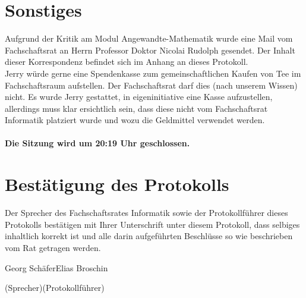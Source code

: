 \documentclass[a4paper, 11pt]{article} %
\newcommand{\protokoller}{Elias Broschin}
\newcommand{\fsiPresident}{Georg Schäfer}
\begin{document}
\section{Sonstiges}
Aufgrund der Kritik am Modul Angewandte-Mathematik wurde eine Mail vom Fachschaftsrat an Herrn Professor Doktor Nicolai Rudolph gesendet. Der Inhalt dieser Korrespondenz befindet sich im Anhang an dieses Protokoll.\\
Jerry würde gerne eine Spendenkasse zum gemeinschaftlichen Kaufen von Tee im Fachschaftsraum aufstellen. Der Fachschaftsrat darf dies (nach unserem Wissen) nicht. Es wurde Jerry gestattet, in eigeninitiative eine Kasse aufzustellen, allerdings muss klar ersichtlich sein, dass diese nicht vom Fachschaftsrat Informatik platziert wurde und wozu die Geldmittel verwendet werden.\\\\
\textbf{Die Sitzung wird um 20:19 Uhr geschlossen.}
\pagebreak

\section{Bestätigung des Protokolls}
Der Sprecher des Fachschaftsrates Informatik sowie der Protokollführer dieses Protokolls bestätigen mit Ihrer Unterschrift unter diesem Protokoll, dass selbiges inhaltlich korrekt ist und alle darin aufgeführten Beschlüsse so wie beschrieben vom Rat getragen werden.
\\

\vspace{3.5cm}
\hrulefill \hfill \hrulefill

\fsiPresident \hfill \protokoller

{\footnotesize (Sprecher)\hfill (Protokollführer)}

\pagebreak
\end{document}
